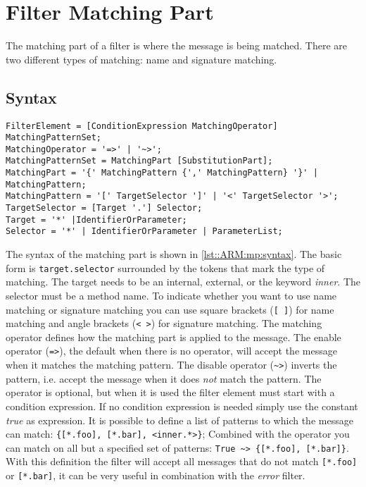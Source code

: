 \chapter{Filter Matching Part}
The matching part of a filter is where the message is being matched. 
There are two different types of matching: name and signature matching.

\section{Syntax}
\begin{lstlisting}[caption={Filter matching part syntax},label=lst::ARM:mp:syntax,style = listing,language = ebnf,float=tpb]
FilterElement = [ConditionExpression MatchingOperator] MatchingPatternSet;
MatchingOperator = '=>' | '~>';
MatchingPatternSet = MatchingPart [SubstitutionPart];
MatchingPart = '{' MatchingPattern {',' MatchingPattern} '}' | MatchingPattern;
MatchingPattern = '[' TargetSelector ']' | '<' TargetSelector '>';
TargetSelector = [Target '.'] Selector;
Target = '*' |IdentifierOrParameter;
Selector = '*' | IdentifierOrParameter | ParameterList;
\end{lstlisting}
The syntax of the matching part is shown in \autoref{lst::ARM:mp:syntax}. 
The basic form is \lstinline|target.selector| surrounded by the tokens that mark the type of matching. 
The target needs to be an internal, external, or the keyword \emph{inner}. 
The selector must be a method name.
To indicate whether you want to use name matching or signature matching you can use square brackets (\lstinline![ ]!) for name matching and angle brackets (\lstinline!< >!) for signature matching.
The matching operator defines how the matching part is applied to the message.
The enable operator (\lstinline[language=Composestar]|=>|), the default when there is no operator, will accept the message when it matches the matching pattern.
The disable operator (\lstinline[language=Composestar]|~>|) inverts the pattern, i.e. accept the message when it does \emph{not} match the pattern.
The operator is optional, but when it is used the filter element must start with a condition expression.
If no condition expression is needed simply use the constant \emph{true} as expression.
It is possible to define a list of patterns to which the message can match: \lstinline[language=Composestar]|{[*.foo], [*.bar], <inner.*>}|;
Combined with the operator you can match on all but a specified set of patterns: \lstinline[language=Composestar]|True ~> {[*.foo], [*.bar]}|.
With this definition the filter will accept all messages that do not match \lstinline[language=Composestar]|[*.foo]| or \lstinline|[*.bar]|, it can be very useful in combination with the \emph{error} filter.

